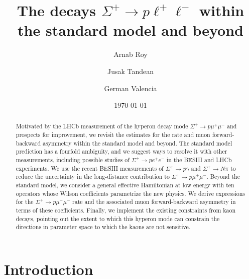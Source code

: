 \documentclass[amsmath,amssymb,aps,nofootinbib,prd,preprint,superscriptaddress,tightenlines,a4paper,bm]{revtex4-2}
\begin{document}
\baselineskip=17pt \parskip=5pt

\title{The decays \boldmath$\Sigma^+\to p \ell^+\ell^-$ within the standard model and beyond}

\author{Arnab Roy}

\author{Jusak Tandean}

\author{German Valencia}

\date{\today}

\begin{abstract}

Motivated by the LHCb measurement of the hyperon decay mode $\Sigma^+\to p\mu^+\mu^-$ and prospects for improvement, we revisit the estimates for the rate and muon forward-backward asymmetry within the standard model and beyond.
The standard model prediction has a fourfold ambiguity, and we suggest ways to resolve it with other measurements, including possible studies of $\Sigma^+\to p e^+e^-$ in the BESIII and LHCb experiments.
We use the recent BESIII measurements of $\Sigma^+\to p \gamma$ and $\Sigma^+\to N\pi$ to reduce the uncertainty in the long-distance contribution to $\Sigma^+\to p\mu^+\mu^-$.
Beyond the standard model, we consider a general effective Hamiltonian at low energy with ten operators whose Wilson coefficients parametrize the new physics.
We derive expressions for the $\Sigma^+\to p\mu^+\mu^-$ rate and the associated muon forward-backward asymmetry in terms of these coefficients.
Finally, we implement the existing constraints from kaon decays, pointing out the extent to which this hyperon mode can constrain the directions in parameter space to which the kaons are not sensitive.

\end{abstract}


\maketitle

\newpage

\section{Introduction}
\end{document}
